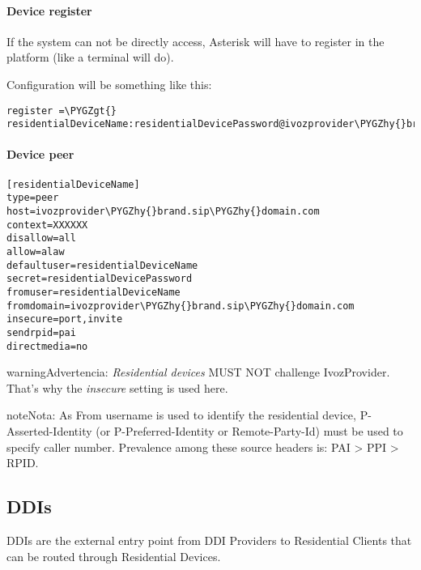 \documentclass[letterpaper,10pt,spanish]{sphinxmanual}
\def\PYGZgt{\char`\>}
\def\PYGZhy{\char`\-}
\begin{document}
\paragraph{Device register}
\label{administration_portal/client/residential/residential_devices:device-register}
If the system can not be directly access, Asterisk will have to register in the
platform (like a terminal will do).

Configuration will be something like this:

\begin{Verbatim}[commandchars=\\\{\}]
register =\PYGZgt{} residentialDeviceName:residentialDevicePassword@ivozprovider\PYGZhy{}brand.sip\PYGZhy{}domain.com
\end{Verbatim}


\paragraph{Device peer}
\label{administration_portal/client/residential/residential_devices:device-peer}
\begin{Verbatim}[commandchars=\\\{\}]
[residentialDeviceName]
type=peer
host=ivozprovider\PYGZhy{}brand.sip\PYGZhy{}domain.com
context=XXXXXX
disallow=all
allow=alaw
defaultuser=residentialDeviceName
secret=residentialDevicePassword
fromuser=residentialDeviceName
fromdomain=ivozprovider\PYGZhy{}brand.sip\PYGZhy{}domain.com
insecure=port,invite
sendrpid=pai
directmedia=no
\end{Verbatim}

\begin{notice}{warning}{Advertencia:}
\emph{Residential devices} MUST NOT challenge IvozProvider. That's
why the \emph{insecure} setting is used here.
\end{notice}

\begin{notice}{note}{Nota:}
As From username is used to identify the residential device, P-Asserted-Identity (or P-Preferred-Identity or Remote-Party-Id) must be used to specify caller number.
Prevalence among these source headers is: PAI \textgreater{} PPI \textgreater{} RPID.
\end{notice}


\subsection{DDIs}
\label{administration_portal/client/residential/ddis:ddis}\label{administration_portal/client/residential/ddis:residential-ddis}\label{administration_portal/client/residential/ddis::doc}
DDIs are the external entry point from DDI Providers to Residential Clients that
can be routed through Residential Devices.
\end{document}
